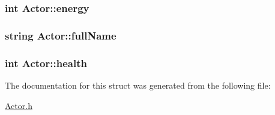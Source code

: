 \subsubsection[{energy}]{\setlength{\rightskip}{0pt plus 5cm}int Actor\+::energy}\label{struct_actor_ab3bf461c752924b24b2b9a81250e5274}
\hypertarget{struct_actor_a2cadac890a05336b48e5b247901f5b08}{}
\subsubsection[{full\+Name}]{\setlength{\rightskip}{0pt plus 5cm}string Actor\+::full\+Name}\label{struct_actor_a2cadac890a05336b48e5b247901f5b08}
\hypertarget{struct_actor_a6932c660e6b6293a66b393c3c9cb151a}{}
\subsubsection[{health}]{\setlength{\rightskip}{0pt plus 5cm}int Actor\+::health}\label{struct_actor_a6932c660e6b6293a66b393c3c9cb151a}


The documentation for this struct was generated from the following file\+:\begin{DoxyCompactItemize}
\item 
\hyperlink{_actor_8h}{Actor.\+h}\end{DoxyCompactItemize}
